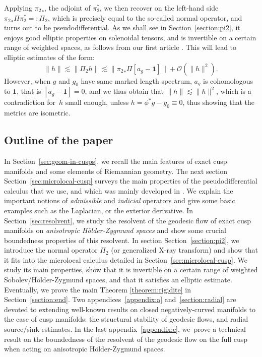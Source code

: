 \documentclass[JEP,XML,SOM,Unicode,NoFloatCountersInSection]{cedram}
\newcommand{\mc}{\mathcal}
\theoremstyle{plain}
\theoremstyle{definition}
\begin{document}
Applying ${\pi_2}_*$, the adjoint of $\pi_2^*$, we then recover on the left-hand side ${\pi_2}_* \Pi \pi_2^* =: \Pi_2$, which is precisely equal to the so-called normal operator, and turns out to be pseudodifferential. As we shall see in Section~\ref{section:pi2}, it enjoys good elliptic properties on solenoidal tensors, and is invertible on a certain range of weighted spaces, as follows from our first article \cite{Bonthonneau-Lefeuvre-19-1}. This will lead to elliptic estimates of the form:
\[
\|h\| \lesssim \|\Pi_2 h\| \lesssim \|{\pi_2}_* \Pi[a_g-\mathbf{1}]\| + \mc{O}(\|h\|^2).
\]
However, when $g$ and $g_0$ have same marked length spectrum, $a_g$ is cohomologous to $\mathbf{1}$, that is $[a_g-\mathbf{1}] = 0$, and we thus obtain that $\|h\| \lesssim \|h\|^2$, which is a contradiction for~$h$ small enough, unless $h = \phi^*g-g_0 \equiv 0$, thus showing that the metrics are isometric.

\subsection{Outline of the paper} In Section~\ref{sec:geom-in-cusps}, we recall the main features of exact cusp manifolds and some elements of Riemannian geometry. The next section Section~\ref{sec:microlocal-cusp} surveys the main properties of the pseudodifferential calculus that we use, and which was mainly developed in \cite{Bonthonneau-16,Bonthonneau-Weich-17,Bonthonneau-Lefeuvre-19-1}. We explain the important notions of \emph{admissible} and \emph{indicial} operators and give some basic examples such as the Laplacian, or the exterior derivative. In Section~\ref{sec:resolvent}, we study the resolvent of the geo\-desic flow of exact cusp manifolds on \emph{anisotropic Hölder-Zygmund spaces} and show some crucial boundedness properties of this resolvent. In section Section~\ref{section:pi2}, we introduce the normal operator $\Pi_2$ (or generalized X-ray transform) and show that it fits into the microlocal calculus detailed in Section~\ref{sec:microlocal-cusp}. We study its main properties, show that it is invertible on a certain range of weighted Sobolev/Hölder-Zygmund spaces, and that it satisfies an elliptic estimate. Eventually, we prove the main Theorem \ref{theorem:rigidite} in Section~\ref{section:end}. Two appendices~\ref{appendix:a} and~\ref{section:radial} are devoted to extending well-known results on closed negatively-curved manifolds to the case of cusp manifolds: the structural stability of geodesic flows, and radial source/sink estimates. In the last appendix~\ref{appendix:c}, we~prove a technical result on the boundedness of the resolvent of the geodesic flow on the full cusp when acting on anisotropic Hölder-Zygmund spaces.
\end{document}
